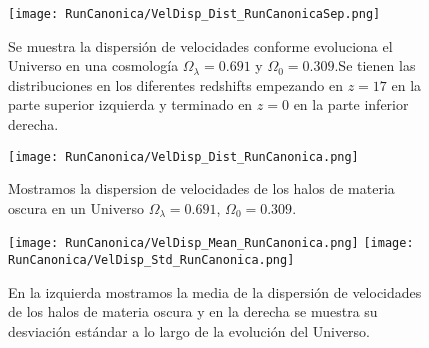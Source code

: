 
\begin{figure}[H]
    \centering
    \texttt{[image: RunCanonica/VelDisp\_Dist\_RunCanonicaSep.png]}
    \caption[Dispersión de velocidades en la evolución de un Universo $\Omega_\lambda = 0.691 $, $\Omega_0 = 0.309$]{\footnotesize Se muestra la dispersión de velocidades conforme evoluciona el Universo en una cosmología $\Omega_\lambda = 0.691 $ y $\Omega_0 = 0.309$.Se tienen las distribuciones en los diferentes redshifts empezando en $z=17$ en la parte superior izquierda y terminado en $z=0$ en la parte inferior derecha.}
    \label{fig:Canon-VelDispDistSep}
\end{figure}

\begin{figure}[H]
    \centering
    \texttt{[image: RunCanonica/VelDisp\_Dist\_RunCanonica.png]}
    \caption[Distribución de la dispersión de velocidades de un Universo $\Omega_\lambda = 0.691 $, $\Omega_0 = 0.309$]{\footnotesize Mostramos la dispersion de velocidades de los halos de materia oscura en un Universo $\Omega_\lambda = 0.691 $, $\Omega_0 = 0.309$.}
    \label{fig:Canon-VelDispDist}
\end{figure}

\begin{figure}[H]
    \centering
    \texttt{[image: RunCanonica/VelDisp\_Mean\_RunCanonica.png]}
    \texttt{[image: RunCanonica/VelDisp\_Std\_RunCanonica.png]}
    \caption[Media y desviación estándar de la dispersión de velocidades de un Universo $\Omega_\lambda = 0.691 $, $\Omega_0 = 0.309$]{\footnotesize En la izquierda mostramos la media de la dispersión de velocidades de los halos de materia oscura y en la derecha se muestra su desviación estándar a lo largo de la evolución del Universo.}
    \label{fig:Canon-VelDispStats}
\end{figure}


